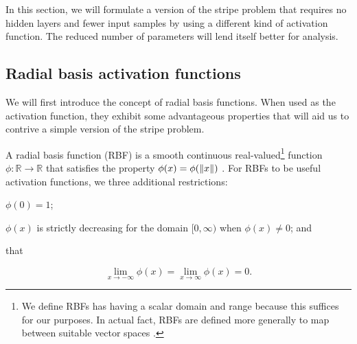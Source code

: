 In this section, we will formulate a version of the stripe problem that requires no hidden layers and fewer input samples by using a different kind of activation function.
The reduced number of parameters will lend itself better for analysis.

\subsection{Radial basis activation functions}
We will first introduce the concept of radial basis functions. 
When used as the activation function, they exhibit some advantageous properties that will aid us to contrive a simple version of the stripe problem.
\begin{definition}
    \label{def:rbf}
    A radial basis function (RBF) is a smooth continuous real-valued\footnote{We define RBFs has having a scalar domain and range because this suffices for our purposes. In actual fact, RBFs are defined more generally to map between suitable vector spaces \cite{buhmann2000}.} function $\phi : \mathbb{R} \rightarrow \mathbb{R}$ that satisfies the property $\phi(x) = \phi(\left\lVert x\right\rVert)$ \cite{buhmann2000}. 
    For RBFs to be useful activation functions, we three additional restrictions:
    \begin{enumerate*}[label=(\roman*)]
        \item $\phi(0)=1$;
        \item $\phi(x)$ is strictly decreasing for the domain $[0, \infty)$ when $\phi(x) \neq 0$; and
        \item that
    \end{enumerate*}
    \begin{equation*}
        \lim_{x\rightarrow -\infty}{\phi(x)} = \lim_{x\rightarrow \infty}{\phi(x)} = 0.
    \end{equation*}
\end{definition}

